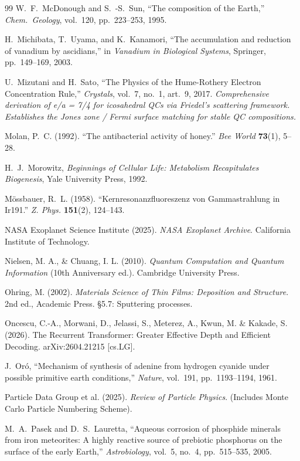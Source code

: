 \documentclass[12pt,oneside]{book}
\theoremstyle{principia}
\theoremstyle{definition}
\theoremstyle{remark}
\begin{document}
\begin{thebibliography}{99}
W.~F.~McDonough and S.~-S.~Sun,
``The composition of the Earth,''
\emph{Chem.\ Geology}, vol.~120, pp.~223--253, 1995.

H.~Michibata, T.~Uyama, and K.~Kanamori,
``The accumulation and reduction of vanadium by ascidians,''
in \emph{Vanadium in Biological Systems}, Springer, pp.~149--169, 2003.

U.~Mizutani and H.~Sato,
``The Physics of the Hume-Rothery Electron Concentration Rule,''
\emph{Crystals}, vol.~7, no.~1, art.~9, 2017.
\textit{Comprehensive derivation of e/a = 7/4 for icosahedral QCs via Friedel's scattering framework. Establishes the Jones zone / Fermi surface matching for stable QC compositions.}

Molan, P.~C. (1992).
``The antibacterial activity of honey.''
\textit{Bee World} \textbf{73}(1), 5--28.

H.~J.~Morowitz,
\emph{Beginnings of Cellular Life: Metabolism Recapitulates Biogenesis},
Yale University Press, 1992.

M\"ossbauer, R.~L. (1958).
``Kernresonanzfluoreszenz von Gammastrahlung in Ir191.''
\textit{Z. Phys.} \textbf{151}(2), 124--143.

NASA Exoplanet Science Institute (2025).
\textit{NASA Exoplanet Archive}. California Institute of Technology.

Nielsen, M. A., \& Chuang, I. L. (2010).
\textit{Quantum Computation and Quantum Information} (10th Anniversary ed.). Cambridge University Press.

Ohring, M. (2002).
\textit{Materials Science of Thin Films: Deposition and Structure}.
2nd ed., Academic Press. \S5.7: Sputtering processes.

Oncescu, C.-A., Morwani, D., Jelassi, S., Meterez, A., Kwun, M. \& Kakade, S. (2026).
The Recurrent Transformer: Greater Effective Depth and Efficient Decoding.
arXiv:2604.21215 [cs.LG].

J.~Or\'o,
``Mechanism of synthesis of adenine from hydrogen cyanide under possible primitive earth conditions,''
\emph{Nature}, vol.~191, pp.~1193--1194, 1961.

Particle Data Group et al. (2025).
\textit{Review of Particle Physics}. 
(Includes Monte Carlo Particle Numbering Scheme).

M.~A.~Pasek and D.~S.~Lauretta,
``Aqueous corrosion of phosphide minerals from iron meteorites: A highly reactive source of prebiotic phosphorus on the surface of the early Earth,''
\emph{Astrobiology}, vol.~5, no.~4, pp.~515--535, 2005.


\end{thebibliography}
\end{document}
